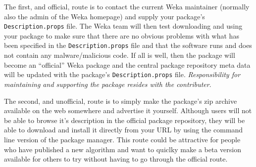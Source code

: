 The first, and official, route is to contact the current Weka
maintainer (normally also the admin of the Weka homepage) and supply
your package's \texttt{Description.props} file. The Weka team will
then test downloading and using your package to make sure that there
are no obvious problems with what has been specified in the
\texttt{Description.props} file and that the software runs and does
not contain any malware/malicious code. If all is well, then the
package will become an ``official'' Weka package and the central
package repository meta data will be updated with the package's
\texttt{Description.props} file. \textit{Responsibility for
  maintaining and supporting the package resides with the
  contributer}.

The second, and unofficial, route is to simply make the package's zip
archive available on the web somewhere and advertise it
yourself. Although users will not be able to browse it's description
in the official package repository, they will be able to download and
install it directly from your URL by using the command line version of
the package manager. This route could be attractive for people who
have published a new algorithm and want to quiclky make a beta version
available for others to try without having to go through the official
route.

